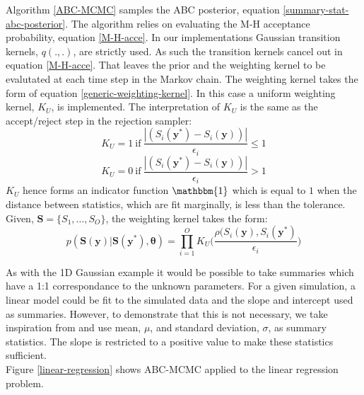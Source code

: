 Algorithm \ref{ABC-MCMC} samples the ABC posterior, equation \ref{summary-stat-abc-posterior}. The algorithm relies on evaluating the M-H acceptance probability, equation \ref{M-H-acce}. In our implementations Gaussian transition kernels, $q(.,.)$, are strictly used. As such the transition kernels cancel out in equation \ref{M-H-acce}. That leaves the prior and the weighting kernel to be evalutated at each time step in the Markov chain. The weighting kernel takes the form of equation \ref{generic-weighting-kernel}. In this case a uniform weighting kernel, $K_U$, is implemented. The interpretation of $K_U$ is the same as the accept/reject step in the rejection sampler: 
\begin{equation}
	K_U = 1\ \text{if}\ \frac{|(S_i(\bm{y^*}) - S_i(\bm{y}))|}{\epsilon_i} \leq 1
\end{equation}
\begin{equation}
	K_U = 0\ \text{if}\ \frac{|(S_i(\bm{y^*}) - S_i(\bm{y}))|}{\epsilon_i} > 1
\end{equation}
$K_U$ hence forms an indicator function $\mathbbm{1}$ which is equal to $1$ when the distance between statistics, which are fit marginally, is less than the tolerance. Given, $\bm{S} = \{S_1,\dots,S_O\}$, the weighting kernel takes the form:
\begin{equation}
	p(\bm{S}(\bm{y})|\bm{S}(\bm{y^*}),\bm{\theta}) = \prod_{i = 1}^{O} K_U\Big(\frac{\rho(S_i(\bm{y}),S_i(\bm{y^*})}{\epsilon_i}\Big)
\end{equation}

As with the 1D Gaussian example it would be possible to take summaries which have a 1:1 correspondance to the unknown parameters. For a given simulation, a linear model could be fit to the simulated data and the slope and intercept used as summaries. However, to demonstrate that this is not necessary, we take inspiration from \citet{vrugt2013toward} and use mean, $\mu$, and standard deviation, $\sigma$, as summary statistics. The slope is restricted to a positive value to make these statistics sufficient. \\

Figure \ref{linear-regression} shows ABC-MCMC applied to the linear regression problem. \\

